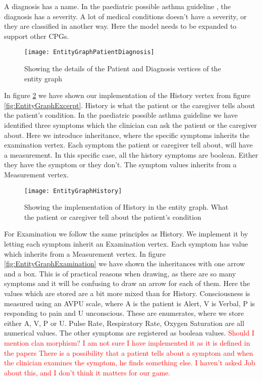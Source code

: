 A diagnosis has a name. In the paediatric possible asthma guideline \cite{RepublicofKeny2016}, the diagnosis has a severity. A lot of medical conditions doesn't have a severity, or they are classified in another way. Here the model needs to be expanded to support other CPGs. 
\begin{figure}[h!]
	\caption {Showing the details of the Patient and Diagnosis vertices of the entity graph}
	\label{fig:EntityGraphPatientDiagnosis}
	\texttt{[image: EntityGraphPatientDiagnosis]}
\end{figure}

In figure \ref{fig:EntityGraphHistory} we have shown our implementation of the History vertex from figure \ref{fig:EntityGraphExcerpt}. History is what the patient or the caregiver tells about the patient's condition. In the paediatric possible asthma guideline \cite{RepublicofKeny2016} we have identified three symptoms which the clinician can ask the patient or the caregiver about. Here we introduce inheritance, where the specific symptoms inherits the examination vertex. Each symptom the patient or caregiver tell about, will have a measurement. In this specific case, all the history symptoms are boolean. Either they have the symptom or they don't. The symptom values inherits from a Measurement vertex.

\begin{figure}[h!]
	\caption {Showing the implementation of History in the entity graph. What the patient or caregiver tell about the patient's condition}
	\label{fig:EntityGraphHistory}
	\texttt{[image: EntityGraphHistory]}
\end{figure}

For Examination we follow the same principles as History. We implement it by letting each symptom inherit an Examination vertex. Each symptom has value which inherits from a Measurement vertex. In figure \ref{fig:EntityGraphExamination} we have shown the inheritances with one arrow and a box. This is of practical reasons when drawing, as there are so many symptoms and it will be confusing to draw an arrow for each of them. Here the values which are stored are a bit more mixed than for History. Consciousness is measured using an AVPU scale, where A is the patient is Alert, V is Verbal, P is responding to pain and U unconscious. These are enumerates, where we store either A, V, P or U. Pulse Rate, Respiratory Rate, Oxygen Saturation are all numerical values. The other symptoms are registered as boolean values.
\textcolor{red}{Should I mention clan morphism? I am not sure I have implemented it as it is defined in the papers}
\textcolor{red}{There is a possibility that a patient tells about a symptom and when the clinician examines the symptom, he finds something else. I haven't asked Job about this, and I don't think it matters for our game.}

